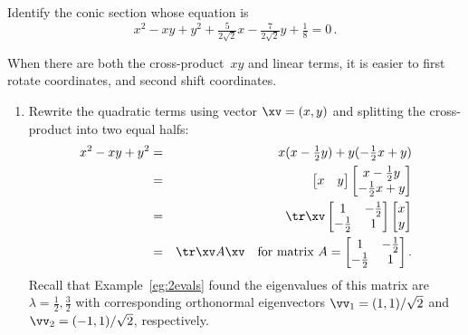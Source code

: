 \begin{example} \label{eg:}
Identify the conic section whose equation is
\begin{equation*}
x^2-xy+y^2+\tfrac5{2\sqrt2}x-\tfrac7{2\sqrt2}y+\tfrac18=0\,.
\end{equation*}
\begin{solution} 
When there are both the cross-product~\(xy\) and linear terms, it is  easier to first rotate coordinates, and second shift coordinates. 
\begin{enumerate}
\item Rewrite the quadratic terms using vector \(\xv=(x,y)\) and splitting the cross-product into two equal halfs:
\begin{eqnarray*}
x^2-xy+y^2
&=&x(x-\tfrac12y)+y(-\tfrac12x+y)
\\&=&\begin{bmatrix} x&y \end{bmatrix}
\begin{bmatrix} x-\tfrac12y\\-\tfrac12x+y \end{bmatrix}
\\&=&\tr\xv 
\begin{bmatrix} 1&-\tfrac12\\-\tfrac12&1 \end{bmatrix}
\begin{bmatrix} x\\y \end{bmatrix}
\\&=&\tr\xv A\xv
\quad\text{for matrix }A=
\begin{bmatrix} 1&-\tfrac12\\-\tfrac12&1 \end{bmatrix}.
\end{eqnarray*}
Recall that Example~\ref{eg:2evals} found the eigenvalues of this matrix are \(\lambda=\tfrac12,\tfrac32\) with corresponding orthonormal eigenvectors \(\vv_1=(1,1)/\sqrt2\) and \(\vv_2=(-1,1)/\sqrt2\), respectively.
\def\temp#1{\begin{tikzpicture}
  \begin{axis}[footnotesize,font=\footnotesize ,axis equal image
  , xlabel={$x$}, ylabel={$y$}, axis lines=middle
  , xtick={-2,-1,1,2}, ytick={-2,-1,1,2}
  ]
  \addplot[brown,quiver={u=3,v=3},-stealth] coordinates {(-1,-1)};
  \node[brown,left] at (axis cs:2,2) {$x'$};
  \addplot[brown,quiver={u=0.707,v=0.707},-stealth,thick] coordinates {(0,0)};
  \node[brown,right] at (axis cs:0.707,0.707) {$\vec v_1$};
  \addplot[brown,quiver={u=-3.2,v=3.2},-stealth] coordinates {(1,-1)};

\end{axis}
\end{tikzpicture}}
\end{enumerate}
\end{solution}
\end{example}
